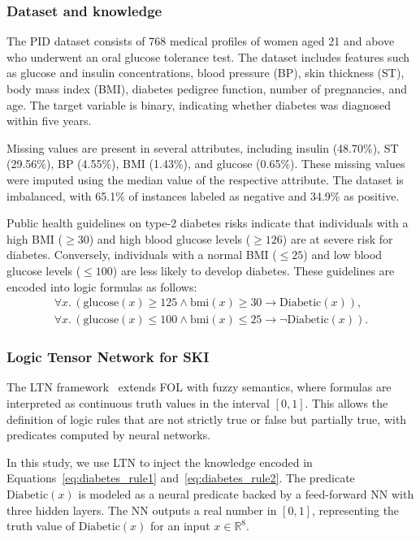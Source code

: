 %
\subsubsection{Dataset and knowledge}
\label{subsubsec:dataset-and-knowledge}
%
The \gls{PID} dataset consists of 768 medical profiles of women aged 21 and above who underwent an oral glucose tolerance test.
%
The dataset includes features such as glucose and insulin concentrations, blood pressure (BP), skin thickness (ST), body mass index (BMI), diabetes pedigree function, number of pregnancies, and age.
%
The target variable is binary, indicating whether diabetes was diagnosed within five years.

%
Missing values are present in several attributes, including insulin (48.70\%), ST (29.56\%), BP (4.55\%), BMI (1.43\%), and glucose (0.65\%).
%
These missing values were imputed using the median value of the respective attribute.
%
The dataset is imbalanced, with 65.1\% of instances labeled as negative and 34.9\% as positive.

%
Public health guidelines on type-2 diabetes risks indicate that individuals with a high BMI (\(\geq 30\)) and high blood glucose levels (\(\geq 126\)) are at severe risk for diabetes.
%
Conversely, individuals with a normal BMI (\(\leq 25\)) and low blood glucose levels (\(\leq 100\)) are less likely to develop diabetes.
%
These guidelines are encoded into logic formulas as follows:
%
\begin{align}
    \forall x.\, (\text{glucose}(x) \geq 125 \land \text{bmi}(x) \geq 30 \rightarrow \text{Diabetic}(x)), \label{eq:diabetes_rule1} \\
    \forall x.\, (\text{glucose}(x) \leq 100 \land \text{bmi}(x) \leq 25 \rightarrow \neg \text{Diabetic}(x)). \label{eq:diabetes_rule2}
\end{align}

%
\subsubsection{Logic Tensor Network for \gls{SKI}}
\label{subsubsec:ltn-for-ski}
%
The \gls{LTN} framework~\cite{BadreddineGSS22} extends \gls{FOL} with fuzzy semantics, where formulas are interpreted as continuous truth values in the interval \([0, 1]\).
%
This allows the definition of logic rules that are not strictly true or false but partially true, with predicates computed by neural networks.

%
In this study, we use \gls{LTN} to inject the knowledge encoded in Equations~\eqref{eq:diabetes_rule1} and~\eqref{eq:diabetes_rule2}.
%
The predicate \(\text{Diabetic}(x)\) is modeled as a neural predicate backed by a feed-forward \gls{NN} with three hidden layers.
%
The NN outputs a real number in \([0, 1]\), representing the truth value of \(\text{Diabetic}(x)\) for an input \(x \in \mathbb{R}^8\).

